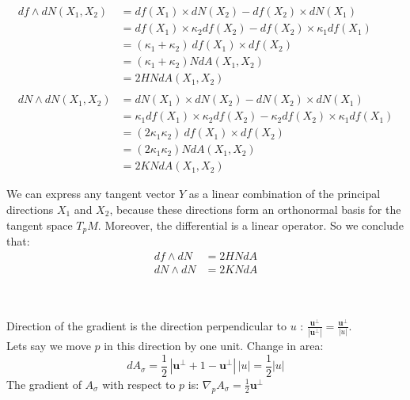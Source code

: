 \documentclass{article}
\newcommand\ifrac[2]{{\displaystyle\frac{#1}{#2}}}
\def\grad{\nabla}
\def\hal{\ifrac{1}{2}}
\begin{document}
\begin{align*}
df \wedge dN (X_1, X_2) &= df(X_1) \times dN(X_2) - df(X_2) \times dN(X_1) \\
                        &= df(X_1) \times \kappa_2 df(X_2) - df(X_2) \times \kappa_1 df(X_1) \\
                        &= (\kappa_1 + \kappa_2) \ df(X_1) \times df(X_2) \\
                        &= (\kappa_1 + \kappa_2) N dA(X_1, X_2) \\
                        &= 2H N dA(X_1, X_2)\\\\
dN \wedge dN (X_1, X_2) &= dN(X_1) \times dN(X_2) - dN(X_2) \times dN(X_1) \\
                        &= \kappa_1 df(X_1) \times \kappa_2 df(X_2) - \kappa_2 df(X_2) \times \kappa_1 df(X_1) \\
                        &= (2 \kappa_1 \kappa_2) \ df(X_1) \times df(X_2) \\
                        &= (2 \kappa_1 \kappa_2) N dA(X_1, X_2) \\
                        &= 2K N dA(X_1, X_2)
\end{align*}

We can express any tangent vector $Y$ as a linear combination of the principal directions $X_1$ and $X_2$,
because these directions form an orthonormal basis for the tangent space $T_p M$.
Moreover, the differential is a linear operator. So we conclude that:
\begin{align*}
    df \wedge dN &= 2H N dA\\
    dN \wedge dN &= 2K N dA
\end{align*}


\vspace{1.8cm}
\\\\


Direction of the gradient is the direction perpendicular to $u$ : $\ifrac{\mathbf{u}^\perp}{|\mathbf{u}^\perp|} = \ifrac{\mathbf{u}^\perp}{|u|}$.\\
Lets say we move $p$ in this direction by one unit. Change in area:
$$dA_\sigma = \hal\,|\mathbf{u}^\perp + 1 - \mathbf{u}^\perp|\, |u| = \hal |u|$$
The gradient of $A_\sigma$ with respect to $p$ is: $\grad_p A_\sigma = \hal \mathbf{u}^\perp$


\vspace{1.8cm}
\\\\
\end{document}
